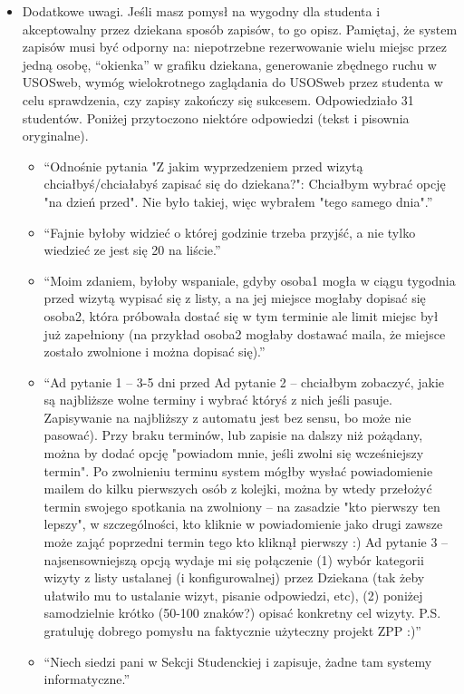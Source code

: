 \documentclass[licencjacka]{pracamgr}
\begin{document}
\begin{itemize}
\item Dodatkowe uwagi. Jeśli masz pomysł na wygodny dla studenta i akceptowalny przez dziekana sposób zapisów, to go opisz. Pamiętaj, że system zapisów musi być odporny na: niepotrzebne rezerwowanie wielu miejsc przez jedną osobę, \enquote{okienka} w grafiku dziekana, generowanie zbędnego ruchu w USOSweb, wymóg wielokrotnego zaglądania do USOSweb przez studenta w celu sprawdzenia, czy zapisy zakończy się sukcesem.
Odpowiedziało 31 studentów. Poniżej przytoczono niektóre odpowiedzi (tekst i pisownia oryginalne).
\begin{itemize}
\setlength\itemsep{0,1em}
\item \enquote{Odnośnie pytania "Z jakim wyprzedzeniem przed wizytą chciałbyś/chciałabyś zapisać się do dziekana?":    Chciałbym wybrać opcję "na dzień przed". Nie było takiej, więc wybrałem "tego samego dnia".}
\item \enquote{Fajnie byłoby widzieć o której godzinie trzeba przyjść, a nie tylko wiedzieć ze jest się 20 na liście.}
\item \enquote{Moim zdaniem, byłoby wspaniale, gdyby osoba1 mogła w ciągu tygodnia przed wizytą wypisać się z listy, a na jej miejsce mogłaby dopisać się osoba2, która próbowała dostać się w tym terminie ale limit miejsc był już zapełniony (na przykład osoba2 mogłaby dostawać maila, że miejsce zostało zwolnione i można dopisać się).}
\item \enquote{Ad pytanie 1 -- 3-5 dni przed    Ad pytanie 2 -- chciałbym zobaczyć, jakie są najbliższe wolne terminy i wybrać któryś z nich jeśli pasuje. Zapisywanie na najbliższy z automatu jest bez sensu, bo może nie pasować). Przy braku terminów, lub zapisie na dalszy niż pożądany, można by dodać opcję "powiadom mnie, jeśli zwolni się wcześniejszy termin". Po zwolnieniu terminu system mógłby wysłać powiadomienie mailem do kilku pierwszych osób z kolejki, można by wtedy przełożyć termin swojego spotkania na zwolniony -- na zasadzie "kto pierwszy ten lepszy", w szczególności, kto kliknie w powiadomienie jako drugi zawsze może zająć poprzedni termin tego kto kliknął pierwszy :)    Ad pytanie 3 -- najsensowniejszą opcją wydaje mi się połączenie    (1) wybór kategorii wizyty z listy ustalanej (i konfigurowalnej) przez Dziekana (tak żeby ułatwiło mu to ustalanie wizyt, pisanie odpowiedzi, etc),    (2) poniżej samodzielnie krótko (50-100 znaków?) opisać konkretny cel wizyty.    P.S. gratuluję dobrego pomysłu na faktycznie użyteczny projekt ZPP :)}
\item \enquote{Niech siedzi pani w Sekcji Studenckiej i zapisuje, żadne tam systemy informatyczne.}

\end{itemize}
\end{itemize}
\end{document}

